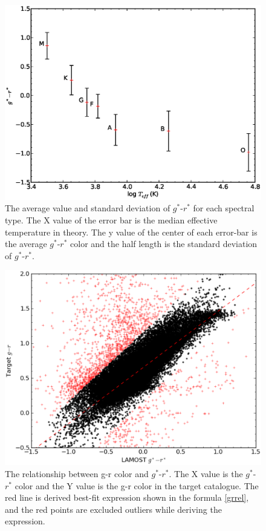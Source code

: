 \documentclass[manuscript]{aastex}
\begin{document}
   \begin{figure}
   \centering
   \includegraphics[width=16cm, angle=0,clip]{f5.eps}
   \caption{The average value and standard deviation of $g^*$-$r^*$ for  each spectral type.
    The X value of  the error bar is the median effective temperature in theory.
   The y value of the center of each error-bar is the average  $g^*$-$r^*$ color and the half length is the standard deviation of $g^*$-$r^*$.
   }
   \label{Fig1}
   \end{figure}

   \begin{figure}
   \centering
   \includegraphics[width=14cm, angle=0, clip=true]{f1.eps}
   \caption{The relationship between g-r color and $g^*$-$r^*$.
   The X value is the $g^*$-$r^*$ color and the Y value is the g-r color  in the target catalogue.
   The red line is  derived best-fit expression shown in the formula \ref{grrel},
   and the red points are excluded outliers while deriving the expression.
   }
   \label{Fig2}
   \end{figure}
\end{document}
